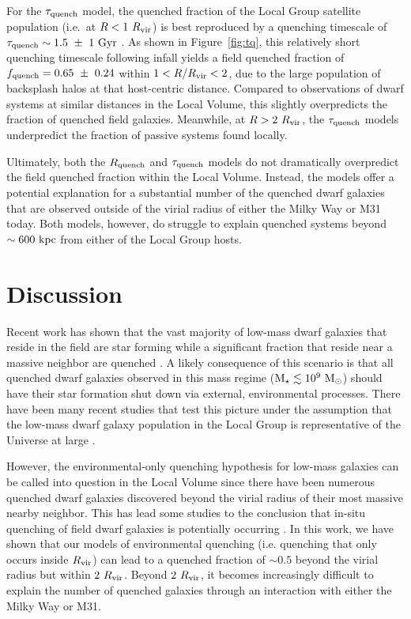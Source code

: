 For the $\tau_{\rm quench}$ model, the quenched fraction of the Local Group
satellite population (i.e.~at $R < 1~R_{\rm{vir}}$) is best reproduced by a quenching
timescale of $\tau_{\rm quench} \sim 1.5~\pm~1~{\rm Gyr}$ \citep{fham15}. As
shown in Figure~\ref{fig:tq}, this relatively short quenching timescale
following infall yields a field quenched fraction of
$f_{\rm quench}=0.65~\pm~0.24$ within $1 < R/R_{\rm{vir}} < 2$, due to the large
population of backsplash halos at that host-centric distance.
%
Compared to observations of dwarf systems at similar distances in the Local
Volume, this slightly overpredicts the fraction of quenched field galaxies.
%
Meanwhile, at $R > 2~R_{\rm{vir}}$, the $\tau_{\rm quench}$ models underpredict the
fraction of passive systems found locally.
%


Ultimately, both the $R_{\rm quench}$ and $\tau_{\rm quench}$ models do not
dramatically overpredict the field quenched fraction within the Local
Volume. Instead, the models offer a potential explanation for a substantial
number of the quenched dwarf galaxies that are observed outside of the virial
radius of either the Milky Way or M31 today. Both models, however, do struggle
to explain quenched systems beyond $\sim600~{\rm kpc}$ from either of the Local
Group hosts.
%




\section{Discussion}
\label{sec:disc}

Recent work has shown that the vast majority of low-mass dwarf galaxies that
reside in the field are star forming while a significant fraction that reside
near a massive neighbor are quenched \citep[e.g.][]{geha12}.
%
A likely consequence of this scenario is that all quenched dwarf galaxies
observed in this mass regime (${\rm M}_{\star}\lesssim10^{9}~{\rm M}_{\odot}$) should have their
star formation shut down via external, environmental processes.
%
There have been many recent studies that test this picture under the assumption
that the low-mass dwarf galaxy population in the Local Group is representative
of the Universe at large \citep[e.g.][]{wheeler14, slater14, weisz15, wetzel15b,
  fham15, fham16}.
%

However, the environmental-only quenching hypothesis for low-mass galaxies can
be called into question in the Local Volume since there have been numerous
quenched dwarf galaxies discovered beyond the virial radius of their most
massive nearby neighbor.
%
This has lead some studies to the conclusion that in-situ quenching of field
dwarf galaxies is potentially occurring \citep{makarova17}.
%
In this work, we have shown that our models of environmental quenching
(i.e. quenching that only occurs inside $R_{\rm vir}$) can lead to a quenched
fraction of $\sim0.5$ beyond the virial radius but within $2~R_{\rm{vir}}$.
%
Beyond $2~R_{\rm{vir}}$, it becomes increasingly difficult to explain the
number of quenched galaxies through an interaction with either the
Milky Way or M31.
%



